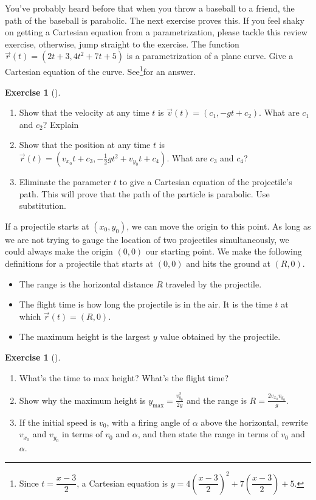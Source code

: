\documentclass[10pt,]{book}
\theoremstyle{plain}
\theoremstyle{definition}
\theoremstyle{definition}
\theoremstyle{definition}
\theoremstyle{definition}
\newtheorem{exploration}[project]{Exercise}
\theoremstyle{definition}
\numberwithin{equation}{section}
\newcommand{\ds}{\displaystyle}
\begin{document}
%
\par
You've probably heard before that when you throw a baseball to a friend, the path of the baseball is parabolic. The next exercise proves this. If you feel shaky on getting a Cartesian equation from a parametrization, please tackle this review exercise, otherwise, jump straight to the exercise.%
The function \(\vec r(t) = (2t+3, 4t^2+7t+5)\) is a parametrization of a plane curve. Give a Cartesian equation of the curve. See\footnote{Since \(t=\dfrac{x-3}{2}\), a Cartesian equation is \(y = 4\left(\dfrac{x-3}{2}\right)^2+7\left(\dfrac{x-3}{2}\right)+5\).\label{fn-7}}for an answer.%
\begin{exploration}[]\label{exploration-160}
\leavevmode%
\begin{enumerate}[font=\bfseries,label=(\alph*),ref=\alph*]
\item\label{task-373} Show that the velocity at any time \(t\) is \(\vec v(t) = (c_1,-gt+c_2)\). What are \(c_1\) and \(c_2\)? Explain%
\item\label{task-374} Show that the position at any time \(t\) is \(\vec r(t) = (v_{x_0}t+c_3, -\frac{1}{2}gt^2+v_{y_0}t+c_4)\). What are \(c_3\) and \(c_4\)?%
\item\label{task-375} Eliminate the parameter \(t\) to give a Cartesian equation of the projectile's path. This will prove that the path of the particle is parabolic. Use substitution.%
%
\end{enumerate}
\end{exploration}
If a projectile starts at \((x_0,y_0)\), we can move the origin to this point. As long as we are not trying to gauge the location of two projectiles simultaneously, we could always make the origin \((0,0)\) our starting point. We make the following definitions for a projectile that starts at \((0,0)\) and hits the ground at \((R,0)\). \leavevmode%
\begin{itemize}[label=\textbullet]
\item{}The range is the horizontal distance \(R\) traveled by the projectile.%
\item{}The flight time is how long the projectile is in the air. It is the time \(t\) at which \(\vec r(t)=(R,0)\).%
\item{}The maximum height is the largest \(y\) value obtained by the projectile.%
\end{itemize}
%
\begin{exploration}[]\label{exploration-161}
\leavevmode%
\begin{enumerate}[font=\bfseries,label=(\alph*),ref=\alph*]
\item\label{task-376} What's the time to max height?  What's the flight time?%
\item\label{task-377} Show why the maximum height is \(\ds y_{\max}=\frac{v_{y_0}^2}{2g}\) and the range is \(\ds R=\frac{2v_{x_0}v_{y_0}}{g}\).%
\item\label{task-378} If the initial speed is \(v_0\), with a firing angle of \(\alpha\) above the horizontal, rewrite \(v_{x_0}\) and \(v_{y_0}\) in terms of \(v_0\) and \(\alpha\), and then state the range in terms of \(v_0\) and \(\alpha\).%
\end{enumerate}
\end{exploration}
\end{document}
